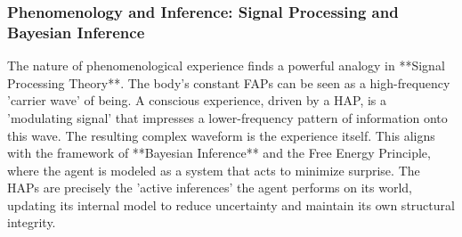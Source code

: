 \subsubsection{Phenomenology and Inference: Signal Processing and Bayesian Inference}
\label{ssubsec:formal_phenomenology}
The nature of phenomenological experience finds a powerful analogy in **Signal Processing Theory**. The body's constant FAPs can be seen as a high-frequency 'carrier wave' of being. A conscious experience, driven by a HAP, is a 'modulating signal' that impresses a lower-frequency pattern of information onto this wave. The resulting complex waveform is the experience itself. This aligns with the framework of **Bayesian Inference** and the Free Energy Principle, where the agent is modeled as a system that acts to minimize surprise. The HAPs are precisely the 'active inferences' the agent performs on its world, updating its internal model to reduce uncertainty and maintain its own structural integrity.
